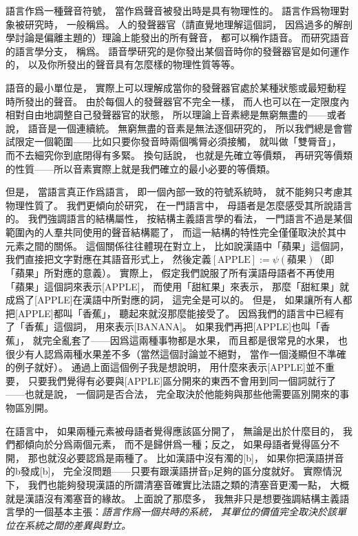 語言作爲一種聲音符號，
當作爲聲音被發出時是具有物理性的。
語言作爲物理對象被研究時，
一般稱爲。
人的發聲器官（請直覺地理解這個詞，
因爲過多的解剖學討論是偏離主題的）理論上能發出的所有聲音，
都可以稱作語音。
而研究語音的語言學分支，
稱爲。
語音學研究的是你發出某個音時你的發聲器官是如何運作的，
以及你所發出的聲音具有怎麼樣的物理性質等等。

語音的最小單位是，
實際上可以理解成當你的發聲器官處於某種狀態或最短動程時所發出的聲音。
由於每個人的發聲器官不完全一樣，
而人也可以在一定限度內相對自由地調整自己發聲器官的狀態，
所以理論上音素總是無窮無盡的——或者說，
語音是一個連續統。
無窮無盡的音素是無法逐個研究的，
所以我們總是會嘗試限定一個範圍——比如只要你發音時兩個嘴脣必須接觸，
就叫做「雙脣音」，
而不去細究你到底閉得有多緊。
換句話說，
也就是先確立等價類，
再研究等價類的性質——所以音素實際上就是我們確立的最小必要的等價類。

但是，
當語言真正作爲語言，
即一個內部一致的符號系統時，
就不能夠只考慮其物理性質了。
我們更傾向於研究，
在一門語言中，
母語者是怎麼感受其所說語言的。
我們強調語言的結構屬性，
按結構主義語言學的看法，
一門語言不過是某個範圍內的人羣共同使用的聲音結構罷了，
而這一結構的特性完全僅僅取決於其中元素之間的關係。
這個關係往往體現在對立上，
比如說漢語中「蘋果」這個詞，
我們直接把文字對應在其語音形式上，
然後定義$\left[\text{APPLE}\right]:=\psi(\text{蘋果})$（即「蘋果」所對應的意義）。
實際上，
假定我們說服了所有漢語母語者不再使用「蘋果」這個詞來表示[APPLE]，
而使用「甜紅果」來表示，
那麼「甜紅果」就成爲了[APPLE]在漢語中所對應的詞，
這完全是可以的。
但是，
如果讓所有人都把[APPLE]都叫「香蕉」，
聽起來就沒那麼能接受了。
因爲我們的語言中已經有了「香蕉」這個詞，
用來表示[BANANA]。
如果我們再把[APPLE]也叫「香蕉」，
就完全亂套了——因爲這兩種事物都是水果，
而且都是很常見的水果，
也很少有人認爲兩種水果差不多（當然這個討論並不絕對，
當作一個淺顯但不準確的例子就好）。
通過上面這個例子我是想說明，
用什麼來表示[APPLE]並不重要，
只要我們覺得有必要與[APPLE]區分開來的東西不會用到同一個詞就行了——也就是說，
一個詞是否合法，
完全取決於他能夠與那些他需要區別開來的事物區別開。

在語言中，
如果兩種元素被母語者覺得應該區分開了，
無論是出於什麼目的，
我們都傾向於分爲兩個元素，
而不是歸併爲一種；反之，
如果母語者覺得區分不開，
那也就沒必要認爲是兩種了。
比如漢語中沒有濁的[b]，
如果你把漢語拼音的b發成[b]，
完全沒問題——只要有跟漢語拼音p足夠的區分度就好。
實際情況下，
我們也能夠發現漢語的所謂清塞音確實比法語之類的清塞音更濁一點，
大概就是漢語沒有濁塞音的緣故。
上面說了那麼多，
我無非只是想要強調結構主義語言學的一個基本主張：\textit{語言作爲一個共時的系統，
其單位的價值完全取決於該單位在系統之間的差異與對立。
}

